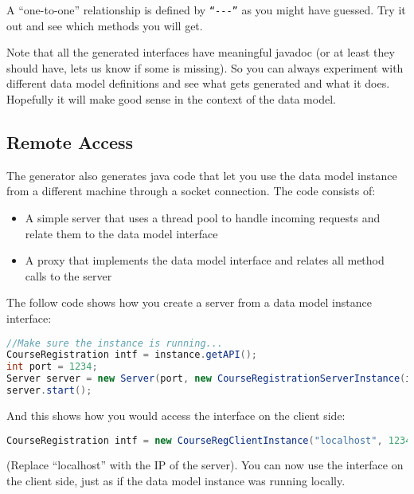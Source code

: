 A ``one-to-one'' relationship is defined by \texttt{``-{}-{}-''}
as you might have guessed. Try it out and see which methods you will
get.

Note that all the generated interfaces have meaningful javadoc (or
at least they should have, lets us know if some is missing). So you
can always experiment with different data model definitions and see
what gets generated and what it does. Hopefully it will make good
sense in the context of the data model.


\subsection{Remote Access}

The generator also generates java code that let you use the data model
instance from a different machine through a socket connection. The
code consists of:
\begin{itemize}
\item A simple server that uses a thread pool to handle incoming requests
and relate them to the data model interface
\item A proxy that implements the data model interface and relates all method
calls to the server
\end{itemize}
The follow code shows how you create a server from a data model instance
interface:

\begin{lstlisting}[basicstyle={\scriptsize},language=Java,tabsize=2]
//Make sure the instance is running...
CourseRegistration intf = instance.getAPI();
int port = 1234;
Server server = new Server(port, new CourseRegistrationServerInstance(intf));
server.start();
\end{lstlisting}


And this shows how you would access the interface on the client side:

\begin{lstlisting}[basicstyle={\scriptsize},language=Java,tabsize=2]
CourseRegistration intf = new CourseRegClientInstance("localhost", 1234);
\end{lstlisting}


(Replace ``localhost'' with the IP of the server). You can now use
the interface on the client side, just as if the data model instance
was running locally. 
